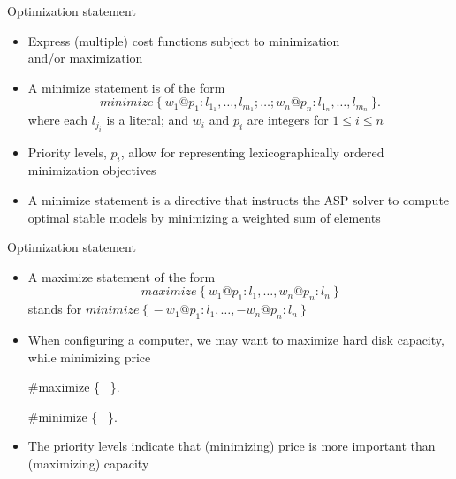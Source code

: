 \begin{frame}{Optimization statement}
  \label{eq:minimize}
  \begin{itemize}
  \item {} Express (multiple) cost functions subject to minimization\\ and/or maximization
  \item {} A \alert{minimize statement} is of the form
    \[
    \mathit{minimize}~\{\ {w_1@p_1}\mathbin{:}{ l_{1_1},\dots, l_{m_1}};
                          \dots;
                          {w_n@p_n}\mathbin{:}{ l_{1_n},\dots, l_{m_n}}\ \}.
    \]
    where each $l_{j_i}$ is a literal;
    and $w_i$ and $p_i$ are integers for $1\leq i\leq n$
    \smallskip
  \item<2-> [] Priority levels, $p_i$, allow for representing lexicographically ordered minimization objectives
    \smallskip
  \item<3->  A minimize statement is a directive that instructs the ASP solver to
    compute optimal stable models by minimizing a weighted sum of elements
  \end{itemize}
\end{frame}
\begin{frame}[fragile]{Optimization statement}
  \begin{itemize}
  \item<1-> A maximize statement of the form
    \[
    \mathit{maximize}~\{\ w_1@p_1:l_1,\dots,w_n@p_n:l_n\ \}
    \]
    stands for
    \(
    \mathit{minimize}~\{\ {-}w_1@p_1:l_1,\dots,{-}w_n@p_n:l_n\ \}
    \)
    \medskip
  \item<2-> 
    When configuring a computer, we may want to maximize hard disk capacity,
    while minimizing price

\parbox{\linewidth}{\footnotesize%
\begin{semiverbatim}
  \#maximize \{\  \}.

  \#minimize \{\  \}.
\end{semiverbatim}}

  \item<2-> [] The priority levels indicate that (minimizing) price is more important than (maximizing) capacity
  \end{itemize}
\end{frame}
